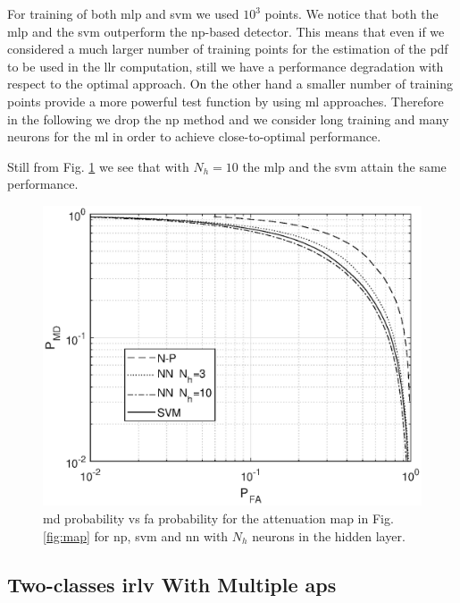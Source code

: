 \documentclass[draftcls,onecolumn,12pt]{IEEEtran}
\begin{document}
For training of both \ac{mlp} and \ac{svm} we used $10^3$ points. We notice that both the \ac{mlp} and the \ac{svm} outperform the \ac{np}-based detector. This means that even if we considered a much larger number of training points for the estimation of the \ac{pdf} to be used in the \ac{llr} computation, still we have a performance degradation with respect to the optimal approach. On the other hand a smaller number of training points provide a more powerful test function by using \ac{ml} approaches. Therefore in the following we drop the \ac{np} method and we consider long training and many neurons for the \ac{ml} in order to achieve close-to-optimal performance.

Still from Fig. \ref{fig:trueMap} we see that with $N_h=10$ the \ac{mlp} and the \ac{svm} attain the same performance. 

\begin{figure}[t]
    \centering
    \includegraphics[width=0.6\columnwidth]{res_NP_approx_SVM.eps}
    \caption{\ac{md} probability vs \ac{fa} probability for the attenuation map in Fig. \ref{fig:map} for \ac{np}, \ac{svm} and \ac{nn} with $N_h$ neurons in the hidden layer.}
    \label{fig:trueMap}
\end{figure}


\subsection{Two-classes \ac{irlv} With Multiple \acp{ap}}\label{sec:res_fading}
\end{document}
